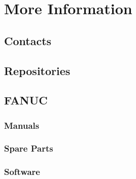 \section{More Information}

\subsection{Contacts}
\subsection{Repositories}
\subsection{FANUC}
    \subsubsection{Manuals}
    \subsubsection{Spare Parts}
\subsubsection{Software}
